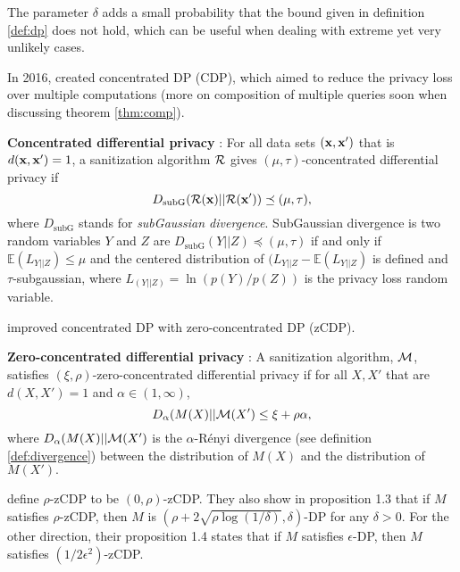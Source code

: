 The parameter $\delta$ adds a small probability that the bound given in definition \ref{def:dp} does not hold, which can be useful when dealing with extreme yet very unlikely cases.

In 2016, \citet{dwork2016concentrated} created concentrated DP (CDP), which aimed to reduce the privacy loss over multiple computations (more on composition of multiple queries soon when discussing theorem \ref{thm:comp}).

\begin{defn}\label{def:cdp} \textbf{Concentrated differential privacy} \citep{dwork2016concentrated}:
For all data sets $(\mathbf{x},\mathbf{x}')$ that is $d(\mathbf{x},\mathbf{x}')=1$, a sanitization algorithm $\mathcal{R}$ gives $(\mu, \tau)$-concentrated differential privacy if 
\begin{equation}
    D_{\text{subG}}(\mathcal{R}(\mathbf{x})||\mathcal{R}(\mathbf{x}')) \preceq (\mu,\tau),
\end{equation}
where $D_{\text{subG}}$ stands for \emph{subGaussian divergence}. SubGaussian divergence is two random variables $Y$ and $Z$ are $D_{\text{subG}}(Y||Z) \preceq (\mu,\tau)$ if and only if  $\mathbb{E}(L_{Y||Z})\leq \mu$ and the centered distribution of $(L_{Y||Z}-\mathbb{E}(L_{Y||Z})$ is defined and $\tau$-subgaussian, where  $L_{(Y||Z)}=\ln\left(p(Y) /p(Z) \right)$ is the privacy loss random variable.
\end{defn}

\citet{bun2016concentrated} improved concentrated DP with zero-concentrated DP (zCDP).

\begin{defn}\label{def:scdp} \textbf{Zero-concentrated differential privacy} \citep{bun2016concentrated}:
A sanitization algorithm, $\mathcal{M}$, satisfies $(\xi, \rho)$-zero-concentrated differential privacy if for all $X, X'$ that are $d(X,X')=1$ and $\alpha\in (1, \infty)$,
    \begin{equation}
        D_\alpha(M(X)||\mathcal{M}(X')\leq\xi+\rho\alpha,
    \end{equation}
    where $D_\alpha(M(X)||\mathcal{M}(X')$ is the $\alpha$-R\'enyi divergence (see definition \ref{def:divergence}) between the distribution of $M(X)$ and the distribution of $M(X').$
\end{defn}
\citet{bun2016concentrated} define $\rho$-zCDP to be $(0,\rho)$-zCDP. They also show in proposition 1.3 that if $M$ satisfies $\rho$-zCDP, then $M$ is $(\rho+2\sqrt{\rho\log(1/\delta)},\delta)$-DP for any $\delta>0$. For the other direction, their proposition 1.4 states that if $M$ satisfies $\epsilon$-DP, then $M$ satisfies $(1/2\epsilon^2)$-zCDP.

